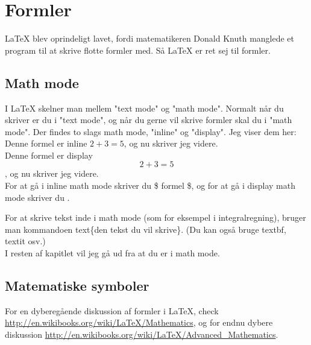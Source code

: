 \chapter{Formler}
\label{chap:formler}
LaTeX blev oprindeligt lavet, fordi matematikeren Donald Knuth manglede et program til at skrive flotte formler med. Så LaTeX er ret sej til formler.

\section{Math mode}
I LaTeX skelner man mellem "text mode" og "math mode". Normalt når du skriver er du i "text mode", og når du gerne vil skrive formler skal du i "math mode". Der findes to slags math mode, "inline" og "display". Jeg viser dem her:\\

\indent Denne formel er inline $2 + 3 = 5$, og nu skriver jeg videre.\\
\indent Denne formel er display \[2 + 3 = 5\]\indent, og nu skriver jeg videre.\\

\noindent For at gå i inline math mode skriver du \$ formel \$, og for at gå i display math mode skriver du \bs [ formel \bs ].

For at skrive tekst inde i math mode (som for eksempel i integralregning), bruger man kommandoen \bs text\{den tekst du vil skrive\}. (Du kan også bruge \bs textbf, \bs textit osv.)\\

\noindent
I resten af kapitlet vil jeg gå ud fra at du er i math mode.

\section{Matematiske symboler}


For en dyberegående diskussion af formler i LaTeX, check \url{http://en.wikibooks.org/wiki/LaTeX/Mathematics}, og for endnu dybere diskussion \url{http://en.wikibooks.org/wiki/LaTeX/Advanced_Mathematics}.
